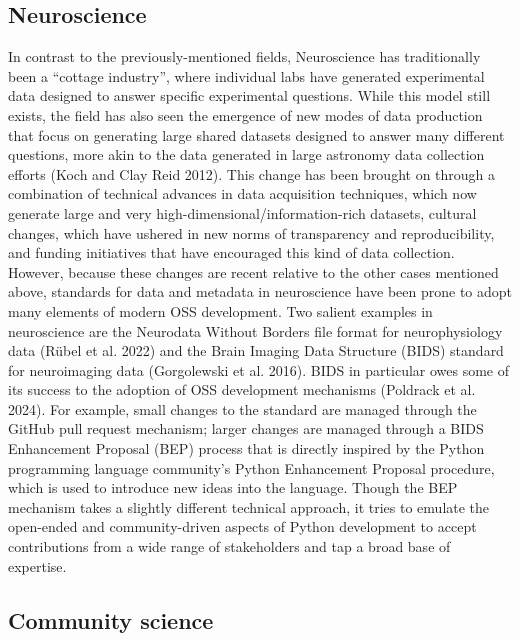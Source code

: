 \documentclass[
  letterpaper,
  DIV=11,
  numbers=noendperiod]{scrartcl}
\begin{document}
\subsection{Neuroscience}\label{neuroscience}

In contrast to the previously-mentioned fields, Neuroscience has
traditionally been a ``cottage industry'', where individual labs have
generated experimental data designed to answer specific experimental
questions. While this model still exists, the field has also seen the
emergence of new modes of data production that focus on generating large
shared datasets designed to answer many different questions, more akin
to the data generated in large astronomy data collection efforts (Koch
and Clay Reid 2012). This change has been brought on through a
combination of technical advances in data acquisition techniques, which
now generate large and very high-dimensional/information-rich datasets,
cultural changes, which have ushered in new norms of transparency and
reproducibility, and funding initiatives that have encouraged this kind
of data collection. However, because these changes are recent relative
to the other cases mentioned above, standards for data and metadata in
neuroscience have been prone to adopt many elements of modern OSS
development. Two salient examples in neuroscience are the Neurodata
Without Borders file format for neurophysiology data (Rübel et al. 2022)
and the Brain Imaging Data Structure (BIDS) standard for neuroimaging
data (Gorgolewski et al. 2016). BIDS in particular owes some of its
success to the adoption of OSS development mechanisms (Poldrack et al.
2024). For example, small changes to the standard are managed through
the GitHub pull request mechanism; larger changes are managed through a
BIDS Enhancement Proposal (BEP) process that is directly inspired by the
Python programming language community's Python Enhancement Proposal
procedure, which is used to introduce new ideas into the language.
Though the BEP mechanism takes a slightly different technical approach,
it tries to emulate the open-ended and community-driven aspects of
Python development to accept contributions from a wide range of
stakeholders and tap a broad base of expertise.

\subsection{Community science}\label{community-science}
\end{document}
